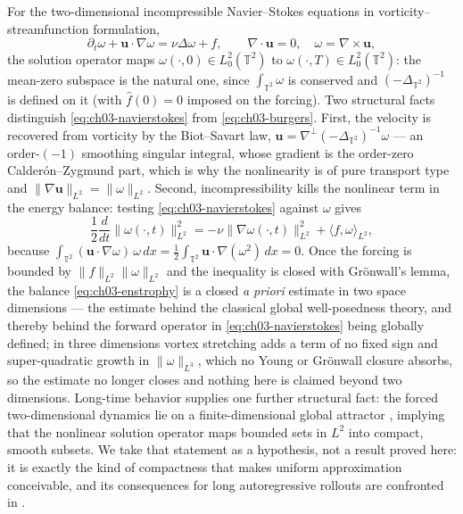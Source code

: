 For the two-dimensional incompressible Navier--Stokes equations in
vorticity--streamfunction formulation, 
\begin{equation}
  \partial_t \omega + \mathbf{u} \cdot \nabla \omega = \nu \Delta \omega + f, \qquad \nabla \cdot \mathbf{u} = 0, \quad \omega = \nabla \times \mathbf{u},
  \label{eq:ch03-navierstokes}
\end{equation}
the solution operator maps $\omega(\cdot, 0) \in L^2_0(\mathbb{T}^2)$ to
$\omega(\cdot, T) \in L^2_0(\mathbb{T}^2)$: the mean-zero subspace is the natural
one, since $\int_{\mathbb{T}^2}\omega$ is conserved and $(-\Delta_{\mathbb{T}^2})^{-1}$
is defined on it (with $\hat{f}(0) = 0$ imposed on the forcing). Two structural facts distinguish
\eqref{eq:ch03-navierstokes} from \eqref{eq:ch03-burgers}. First, the velocity is
recovered from vorticity by the Biot--Savart law,
$\mathbf{u} = \nabla^{\perp}(-\Delta_{\mathbb{T}^2})^{-1}\omega$ --- an order-$(-1)$
smoothing singular integral, whose gradient is the order-zero Calder\'on--Zygmund
part, which is why the nonlinearity is of pure transport
type and $\|\nabla \mathbf{u}\|_{L^2} = \|\omega\|_{L^2}$. Second, incompressibility
kills the nonlinear term in the energy balance: testing \eqref{eq:ch03-navierstokes}
against $\omega$ gives
\begin{equation}
  \frac{1}{2}\frac{d}{dt}\|\omega(\cdot, t)\|_{L^2}^2
  = -\nu \|\nabla \omega(\cdot, t)\|_{L^2}^2 + \langle f, \omega \rangle_{L^2},
  \label{eq:ch03-enstrophy}
\end{equation}
because $\int_{\mathbb{T}^2} (\mathbf{u}\cdot\nabla\omega)\,\omega\,dx =
\tfrac{1}{2}\int_{\mathbb{T}^2} \mathbf{u}\cdot\nabla(\omega^2)\,dx = 0$. Once the
forcing is bounded by $\|f\|_{L^2}\|\omega\|_{L^2}$ and the inequality is closed
with Gr\"onwall's lemma, the balance \eqref{eq:ch03-enstrophy} is a closed
\emph{a priori} estimate in two space dimensions --- the estimate behind the
classical global well-posedness theory, and thereby behind the forward operator in
\eqref{eq:ch03-navierstokes} being globally defined; in three dimensions vortex
stretching adds a term of no fixed sign and super-quadratic growth in
$\|\omega\|_{L^{3}}$, which no Young or Gr\"onwall closure absorbs, so the estimate
no longer closes and nothing here is claimed beyond two
dimensions. Long-time behavior
supplies one further structural fact: the forced two-dimensional dynamics lie on
a finite-dimensional global attractor , implying that
the nonlinear solution operator maps bounded sets in $L^2$ into compact, smooth
subsets. We take that statement as a hypothesis, not a result proved here:
it is exactly the kind of compactness that makes uniform approximation
conceivable, and its consequences for long autoregressive rollouts are confronted
in .

